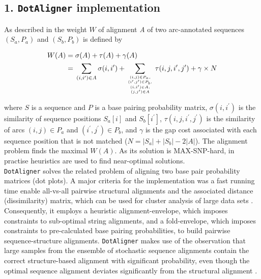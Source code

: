 \documentclass{bmcart}
\newcommand\dotaligner{\texttt{DotAligner}}
\begin{document}
\subsection*{ 1. \dotaligner{} implementation }
\noindent As described in \cite{Palu2010} the weight $W$ of alignment \emph{A}
of two arc-annotated sequences $(S_a,P_a)$ and $(S_b,P_b)$ is defined by

\begin{equation}\label{eq1}
\begin{aligned}
	W(A) ={} & \sigma(A) + \tau(A) + \gamma(A) \\
	     ={} & \sum_{(i,i^\prime) \in A} \sigma(i,i^\prime) + \sum_{(i,j) \in
	P_a,\atop {(i^\prime,j^\prime) \in P_b,\atop {(i,i^\prime) \in
	A,\atop (j,j^\prime) \in A}}} \tau(i,j,i^\prime,j^\prime) + \gamma
	\times N
\end{aligned}
\end{equation}

\noindent where $S$ is a sequence and $P$ is a base pairing probability matrix,
$\sigma(i,i^\prime)$ is the similarity of sequence positions $S_a[i]$ and
$S_b[i^\prime]$, $\tau(i,j,i^\prime,j^\prime)$ is the similarity of arcs $(i,j)
\in P_a$ and $(i^\prime,j^\prime) \in P_b$,
and $\gamma$ is the gap cost associated with each sequence position that is not
matched ($N = |S_a|+|S_b|-2|A|$). The alignment problem finds the maximal
$W(A)$. As its solution is MAX-SNP-hard, in practise heuristics are used to find
near-optimal solutions.\\

\dotaligner{} solves the related problem of aligning two base pair
probability matrices (dot plots). A major criteria for the implementation was a fast
running time enable all-vs-all pairwise structural alignments and the 
associated distance (dissimilarity) matrix, which can be used for 
cluster analysis of large data sets \cite{Will17432929}. Consequently, 
it employs a heuristic alignment-envelope, 
which imposes constraints to sub-optimal string alignments, 
and a fold-envelope, which imposes constraints to pre-calculated base pairing probabilities, 
to build pairwise sequence-structure alignments. 
\dotaligner{} makes use of the observation that large samples from the ensemble 
of stochastic sequence alignments contain the correct structure-based alignment
with significant probability,  even though the optimal
sequence alignment deviates significantly from the structural alignment
\cite{Muckstein12385998}. \\
\end{document}
